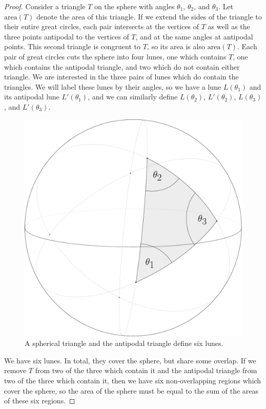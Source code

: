 \begin{proof}
	Consider a triangle $T$ on the sphere with angles $\theta_1$, $\theta_2$, and $\theta_3$.  Let $\mathrm{area}(T)$ denote the area of this triangle. If we extend the sides of the triangle to their entire great circles, each pair intersects at the vertices of $T$ as well as the three points antipodal to the vertices of $T$, and at the same angles at antipodal points.  This second triangle is congruent to $T$, so its area is also $\mathrm{area}(T)$.  Each pair of great circles cuts the sphere into four lunes, one which contains $T$, one which contains the antipodal triangle, and two which do not contain either triangle.  We are interested in the three pairs of lunes which do contain the triangles.  We will label these lunes by their angles, so we have a lune $L(\theta_1)$ and its antipodal lune $L'(\theta_1)$, and we can similarly define $L(\theta_2)$, $L'(\theta_2)$, $L(\theta_3)$, and $L'(\theta_3)$.
	
	
	\begin{figure}[htb]
		\centering
		\includegraphics[width=.35\textwidth]{figs/trilune.pdf}
		\caption{A spherical triangle and the antipodal triangle define six lunes.}
		\label{fig:trilune}
	\end{figure}
	
	
	We have six lunes.  In total, they cover the sphere, but share some overlap.  If we remove $T$ from two of the three which contain it and the antipodal triangle from two of the three which contain it, then we have six non-overlapping regions which cover the sphere, so the area of the sphere must be equal to the sum of the areas of these six regions.  
	

\end{proof}
